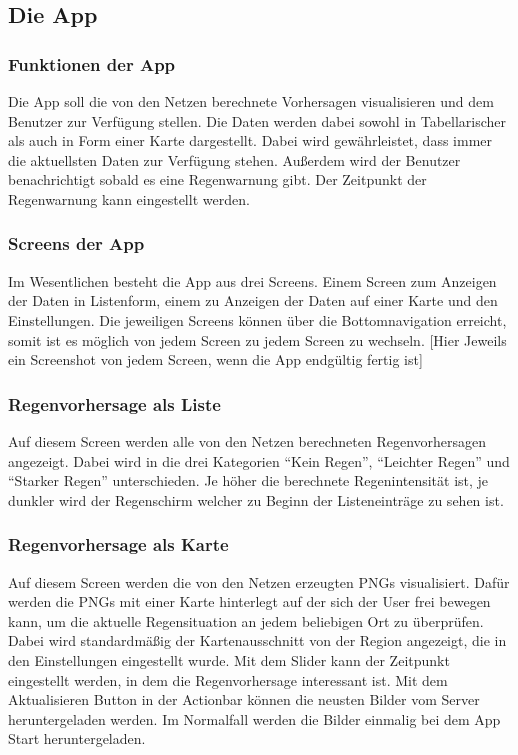 \subsection{Die App}\label{die app}

\subsubsection{Funktionen der App}\label{funkionen der app}
Die App soll die von den Netzen berechnete Vorhersagen visualisieren und dem Benutzer zur Verfügung stellen. Die Daten werden dabei sowohl in Tabellarischer als auch in Form einer Karte dargestellt. Dabei wird gewährleistet, dass immer die aktuellsten Daten zur Verfügung stehen. Außerdem wird der Benutzer benachrichtigt sobald es eine Regenwarnung gibt. Der Zeitpunkt der Regenwarnung kann eingestellt werden.

\subsubsection{Screens der App}\label{screens der app}
Im Wesentlichen besteht die App aus drei Screens. Einem Screen zum Anzeigen der Daten in Listenform, einem zu Anzeigen der Daten auf einer Karte und den Einstellungen. Die jeweiligen Screens können über die Bottomnavigation erreicht, somit ist es möglich von jedem Screen zu jedem Screen zu wechseln.   
[Hier Jeweils ein Screenshot von jedem Screen, wenn die App endgültig fertig ist]  

\subsubsection*{Regenvorhersage als Liste}
Auf diesem Screen werden alle von den Netzen berechneten Regenvorhersagen angezeigt. Dabei wird in die drei Kategorien “Kein Regen”, “Leichter Regen” und “Starker Regen” unterschieden. Je höher die berechnete Regenintensität ist, je dunkler wird der Regenschirm welcher zu Beginn der Listeneinträge zu sehen ist.   

\subsubsection*{Regenvorhersage als Karte}
Auf diesem Screen werden die von den Netzen erzeugten PNGs visualisiert. Dafür werden die PNGs mit einer Karte hinterlegt auf der sich der User frei bewegen kann, um die aktuelle Regensituation an jedem beliebigen Ort zu überprüfen. Dabei wird standardmäßig der Kartenausschnitt von der Region angezeigt, die in den Einstellungen eingestellt wurde. Mit dem Slider kann der Zeitpunkt eingestellt werden, in dem die Regenvorhersage interessant ist. Mit dem Aktualisieren Button in der Actionbar können die neusten Bilder vom Server heruntergeladen werden. Im Normalfall werden die Bilder einmalig bei dem App Start heruntergeladen.  

